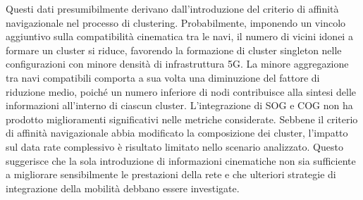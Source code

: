 Questi dati presumibilmente derivano dall'introduzione del criterio di affinità navigazionale nel processo di clustering. Probabilmente, imponendo un vincolo aggiuntivo sulla compatibilità cinematica tra le navi, il numero di vicini idonei a formare un cluster si riduce, favorendo la formazione di cluster singleton nelle configurazioni con minore densità di infrastruttura 5G. La minore aggregazione tra navi compatibili comporta a sua volta una diminuzione del fattore di riduzione medio, poiché un numero inferiore di nodi contribuisce alla sintesi delle informazioni all'interno di ciascun cluster. L'integrazione di \ac{SOG} e \ac{COG} non ha prodotto miglioramenti significativi nelle metriche considerate. Sebbene il criterio di affinità navigazionale abbia modificato la composizione dei cluster, l'impatto sul data rate complessivo è risultato limitato nello scenario analizzato. Questo suggerisce che la sola introduzione di informazioni cinematiche non sia sufficiente a migliorare sensibilmente le prestazioni della rete e che ulteriori strategie di integrazione della mobilità debbano essere investigate.
